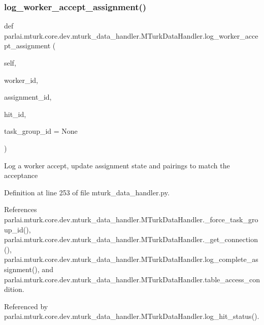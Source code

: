 \subsubsection{\texorpdfstring{log\+\_\+worker\+\_\+accept\+\_\+assignment()}{log\_worker\_accept\_assignment()}}
{\footnotesize\ttfamily def parlai.\+mturk.\+core.\+dev.\+mturk\+\_\+data\+\_\+handler.\+M\+Turk\+Data\+Handler.\+log\+\_\+worker\+\_\+accept\+\_\+assignment (\begin{DoxyParamCaption}\item[{}]{self,  }\item[{}]{worker\+\_\+id,  }\item[{}]{assignment\+\_\+id,  }\item[{}]{hit\+\_\+id,  }\item[{}]{task\+\_\+group\+\_\+id = {\ttfamily None} }\end{DoxyParamCaption})}

\begin{DoxyVerb}Log a worker accept, update assignment state and pairings to match
the acceptance
\end{DoxyVerb}
 

Definition at line 253 of file mturk\+\_\+data\+\_\+handler.\+py.



References parlai.\+mturk.\+core.\+dev.\+mturk\+\_\+data\+\_\+handler.\+M\+Turk\+Data\+Handler.\+\_\+force\+\_\+task\+\_\+group\+\_\+id(), parlai.\+mturk.\+core.\+dev.\+mturk\+\_\+data\+\_\+handler.\+M\+Turk\+Data\+Handler.\+\_\+get\+\_\+connection(), parlai.\+mturk.\+core.\+dev.\+mturk\+\_\+data\+\_\+handler.\+M\+Turk\+Data\+Handler.\+log\+\_\+complete\+\_\+assignment(), and parlai.\+mturk.\+core.\+dev.\+mturk\+\_\+data\+\_\+handler.\+M\+Turk\+Data\+Handler.\+table\+\_\+access\+\_\+condition.



Referenced by parlai.\+mturk.\+core.\+dev.\+mturk\+\_\+data\+\_\+handler.\+M\+Turk\+Data\+Handler.\+log\+\_\+hit\+\_\+status().

